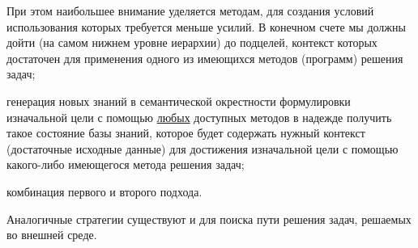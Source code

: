\begin{SCn}
{\begin{scnitemize}
			При этом наибольшее внимание уделяется методам, для создания условий использования которых требуется меньше усилий. В конечном счете мы должны дойти (на самом нижнем уровне иерархии) до подцелей, контекст которых достаточен для применения одного из имеющихся методов (программ) решения задач;
			\item генерация новых знаний в семантической окрестности формулировки изначальной цели с помощью \uline{любых} доступных методов в надежде получить такое состояние базы знаний, которое будет содержать нужный контекст (достаточные исходные данные) для достижения изначальной цели с помощью какого-либо имеющегося метода решения задач;
			\item комбинация первого и второго подхода.
		\end{scnitemize}
Аналогичные стратегии существуют и для поиска пути решения задач, решаемых во внешней среде.}
	
	
\bigskip
\scnendstruct {}
	
\end{SCn}